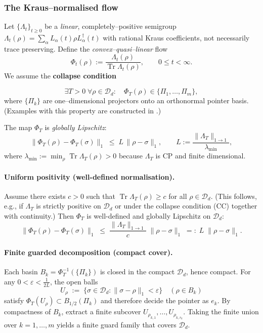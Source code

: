 \documentclass[12pt]{article}
\theoremstyle{definition}
\theoremstyle{plain}
\begin{document}
\subsubsection{The Kraus–normalised flow}

Let \(\{\Lambda_t\}_{t\ge0}\) be a \emph{linear}, completely–positive
semigroup
\(\Lambda_t(\rho)=\sum_{\alpha}L_{\alpha}(t)\rho L_{\alpha}^{\dagger}(t)\)
with rational Kraus coefficients, not necessarily trace preserving.
Define the \emph{convex–quasi–linear} flow
\[
   \Phi_t(\rho)
   :=\frac{\Lambda_t(\rho)}{\operatorname{Tr}\Lambda_t(\rho)},
   \qquad 0\le t<\infty .
\]
We assume the \textbf{collapse condition}

\[
   \exists T>0\; \forall\rho\in\mathcal{D}_d:
   \quad \Phi_T(\rho)\in\{\Pi_1,\dots,\Pi_m\},
   \tag{CC}
\]
where \(\{\Pi_k\}\) are one–dimensional projectors onto an orthonormal
pointer basis.  (Examples with this property are constructed in
\cite{RembielinskiCaban2020}.)

The map \(\Phi_T\) is \emph{globally Lipschitz}:
\[
   \|\Phi_T(\rho)-\Phi_T(\sigma)\|_1
   \;\le\; L\,\|\rho-\sigma\|_1,
   \qquad L:=\frac{\|\Lambda_T\|_{1\to1}}{\lambda_{\min}},
\]
where \(\lambda_{\min}:=\min_{\rho}\operatorname{Tr}\Lambda_T(\rho)>0\)
because \(\Lambda_T\) is CP and finite dimensional.

\paragraph{Uniform positivity (well-defined normalisation).}
Assume there exists $c>0$ such that $\operatorname{Tr}\Lambda_T(\rho)\ge c$ for all $\rho\in\mathcal{D}_d$. (This follows, e.g., if $\Lambda_T$ is strictly positive on $\mathcal{D}_d$ or under the collapse condition (CC) together with continuity.) Then $\Phi_T$ is well-defined and globally Lipschitz on $\mathcal{D}_d$:
\[
\|\Phi_T(\rho)-\Phi_T(\sigma)\|_1
\;\le\; \frac{\|\Lambda_T\|_{1\to1}}{c}\;\|\rho-\sigma\|_1
\;=:\; L\;\|\rho-\sigma\|_1.
\]

\paragraph{Finite guarded decomposition (compact cover).}
Each basin $B_k=\Phi_T^{-1}(\{\Pi_k\})$ is closed in the compact $\mathcal{D}_d$, hence compact. For any $0<\varepsilon<\frac{1}{2L}$, the open balls
\[
U_{\rho} \;:=\; \bigl\{\sigma\in \mathcal{D}_d : \|\sigma-\rho\|_1<\varepsilon\bigr\}
\quad (\rho\in B_k)
\]
satisfy $\Phi_T(U_{\rho})\subset B_{1/2}(\Pi_k)$ and therefore decide the pointer as $e_k$. By compactness of $B_k$, extract a finite subcover $U_{\rho_{k,1}},\dots,U_{\rho_{k,r_k}}$. Taking the finite union over $k=1,\dots,m$ yields a finite guard family that covers $\mathcal{D}_d$.
\end{document}
